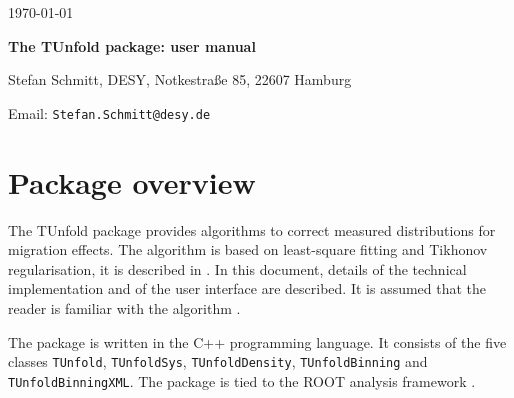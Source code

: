 \documentclass[12pt]{article}
\newcommand{\tunfoldmajor}{17}
\newcommand{\tunfoldminor}{3}
\newcommand{\tunfoldversion}{{\tunfoldmajor{}.\tunfoldminor}}
\begin{document}
\begin{titlepage}
\noindent
\begin{flushleft}
\end{flushleft}
\noindent
       \today      \\

\vspace{2cm}
\begin{center}
\begin{Large}
{\bf The TUnfold package: user manual}
\vspace{2cm}

Stefan Schmitt, DESY, Notkestra\ss{}e 85, 22607 Hamburg

\vspace{0.5cm}
 Email: {\tt Stefan.Schmitt@desy.de}
\end{Large}
\end{center}

\vspace{2cm}

\begin{abstract}

{\em\noindent
TUnfold is a package with provides functionality for correcting
migration and background effects for multi-dimensional distributions.
This document gives a user-oriented technical description of the
package, valid for the version number \tunfoldversion.
}
\end{abstract}

\vspace{1.5cm}

\end{titlepage}

\section{Package overview}

The TUnfold package provides algorithms to correct
measured distributions for migration effects. The algorithm is based
on least-square fitting and Tikhonov regularisation, it is described
in \cite{Schmitt:2012kp}. In this document, details of the technical
implementation and of the user interface are described. It is assumed
that the reader is familiar with the algorithm \cite{Schmitt:2012kp}.

The package is written in the C++ programming language. It consists of
the five classes {\tt TUnfold}, {\tt TUnfoldSys}, {\tt TUnfoldDensity},
{\tt TUnfoldBinning} and {\tt TUnfoldBinningXML}. 
The package is tied to the ROOT analysis
framework \cite{Brun:1997pa}. 
\end{document}
